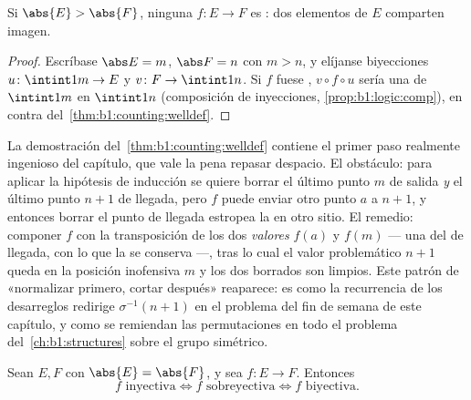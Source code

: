 \begin{corollary}\label{cor:b1:counting:pigeonhole}
Si $\abs{E} > \abs{F}$, ninguna  $f \colon E \to F$ es
: dos elementos de $E$ comparten imagen.
\end{corollary}

\begin{proof}
Escríbase $\abs E = m$, $\abs F = n$ con $m > n$, y elíjanse biyecciones
$u \colon \intint1m \to E$ y $v \colon F \to \intint1n$. Si $f$ fuese
, $v \circ f \circ u$ sería una  de $\intint1m$ en
$\intint1n$ (composición de inyecciones,
\cref{prop:b1:logic:comp}), en contra
del~\cref{thm:b1:counting:welldef}.
\end{proof}

\begin{remark}\label{rem:b1:counting:swapinterlude}
La demostración del~\cref{thm:b1:counting:welldef} contiene el primer
paso realmente ingenioso del capítulo, que vale la pena repasar
despacio. El obstáculo: para aplicar la hipótesis de inducción se
quiere borrar el último punto $m$ de salida \emph{y} el último punto
$n+1$ de llegada, pero $f$ puede enviar otro punto $a$ a $n + 1$, y
entonces borrar el punto de llegada estropea la  en otro
sitio. El remedio: componer $f$ con la transposición de los dos
\emph{valores} $f(a)$ y $f(m)$ --- una  del  de
llegada, con lo que la  se conserva ---, tras lo cual el
valor problemático $n + 1$ queda en la posición inofensiva $m$ y los
dos borrados son limpios. Este patrón de «normalizar primero, cortar
después» reaparece: es como la recurrencia de los desarreglos redirige
$\sigma^{-1}(n+1)$ en el problema del fin de semana de este capítulo, y
como se remiendan las permutaciones en todo el problema
del~\cref{ch:b1:structures} sobre el grupo simétrico.
\end{remark}

\begin{proposition}\label{prop:b1:counting:injsur}
Sean $E, F$  con $\abs{E} = \abs{F}$, y sea $f \colon E
\to F$. Entonces
\[
f \text{ inyectiva} \iff f \text{ sobreyectiva} \iff f \text{ biyectiva}.
\]
\end{proposition}

